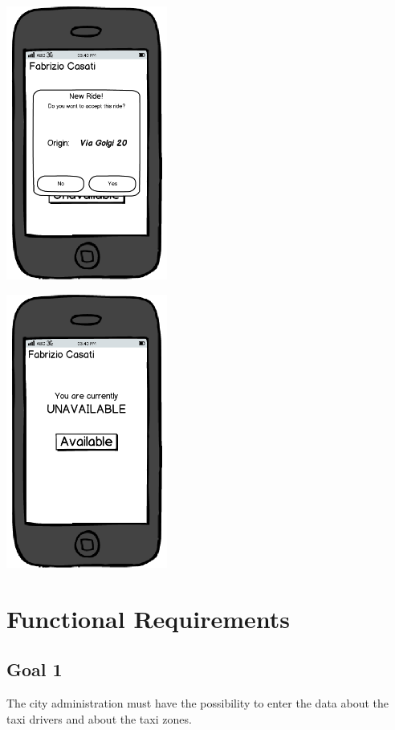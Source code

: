 \begin{center}
\includegraphics[width=150pt,keepaspectratio]{images/taxi_new_ride.png}

\includegraphics[width=150pt,keepaspectratio]{images/taxi_unavailable.png}

\end{center}



\section{Functional Requirements}
\subsection{Goal 1}
The city administration must have the possibility to enter the data about the taxi drivers and about the taxi zones. 


